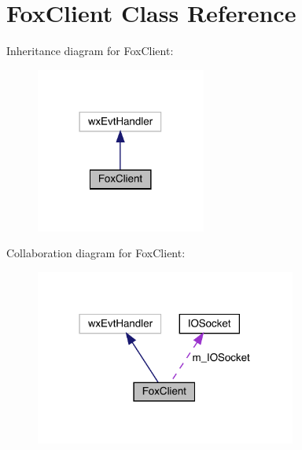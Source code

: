 \hypertarget{class_fox_client}{}\section{Fox\+Client Class Reference}
\label{class_fox_client}


Inheritance diagram for Fox\+Client\+:
\nopagebreak
\begin{figure}[H]
\begin{center}
\leavevmode
\includegraphics[width=158pt]{class_fox_client__inherit__graph}
\end{center}
\end{figure}


Collaboration diagram for Fox\+Client\+:
\nopagebreak
\begin{figure}[H]
\begin{center}
\leavevmode
\includegraphics[width=243pt]{class_fox_client__coll__graph}
\end{center}
\end{figure}
